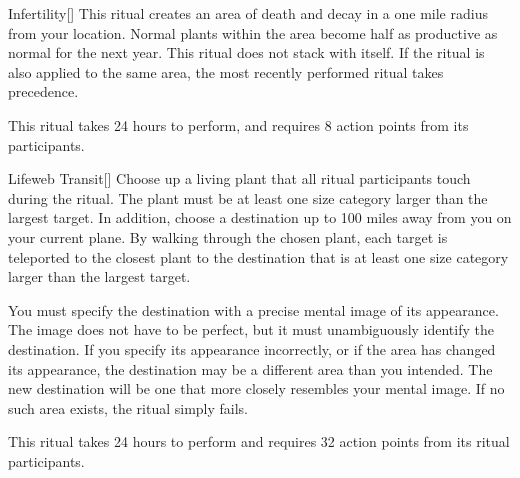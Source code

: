 \lowercase{\hypertarget{spell:Infertility}{}}\label{spell:Infertility}
\begin{apability}[Rank 3]{\hypertarget{spell:Infertility}{Infertility}}[]
\targetrule
This ritual creates an area of death and decay in a one mile radius  from your location.
Normal plants within the area become half as productive as normal for the next year.
This ritual does not stack with itself.
If the  ritual is also applied to the same area, the most recently performed ritual takes precedence.

This ritual takes 24 hours to perform, and requires 8 action points from its participants.
\end{apability}
\vspace{0.25em}



\lowercase{\hypertarget{spell:Lifeweb Transit}{}}\label{spell:Lifeweb Transit}
\begin{apability}[Rank 5]{\hypertarget{spell:Lifeweb Transit}{Lifeweb Transit}}[]
Choose up a living plant that all ritual participants touch during the ritual.
The plant must be at least one size category larger than the largest target.
In addition, choose a destination up to 100 miles away from you on your current plane.
By walking through the chosen plant, each target is teleported to the closest plant to the destination that is at least one size category larger than the largest target.

You must specify the destination with a precise mental image of its appearance.
The image does not have to be perfect, but it must unambiguously identify the destination.
If you specify its appearance incorrectly, or if the area has changed its appearance, the destination may be a different area than you intended.
The new destination will be one that more closely resembles your mental image.
If no such area exists, the ritual simply fails.

This ritual takes 24 hours to perform and requires 32 action points from its ritual participants.
\end{apability}
\vspace{0.25em}


